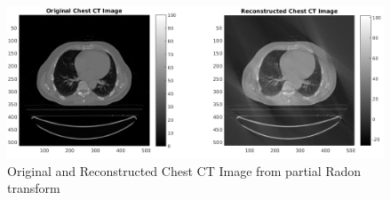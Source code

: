 \documentclass[11pt]{article}
\begin{document}
\begin{figure}[h]
\centering
\includegraphics[scale=0.4]{CT-chest-recons}
\caption{Original and Reconstructed Chest CT Image from partial Radon transform}
\end{figure}
\end{document}
